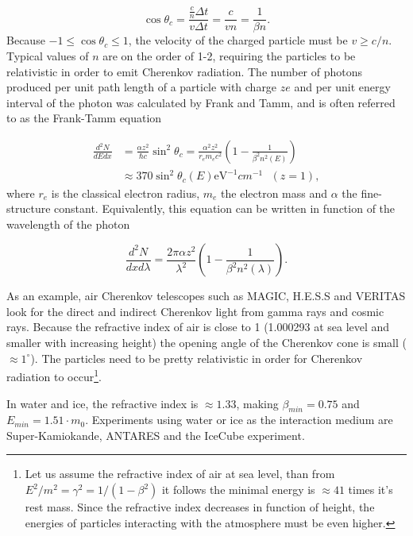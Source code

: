 \begin{equation}
\cos\theta_c = \frac{\frac{c}{n} \Delta t}{v \Delta t} = \frac{c}{vn} = \frac{1}{\beta n}.
\end{equation} 
Because $-1 \leq \cos\theta_c \leq 1$, the velocity of the charged particle must be $v \geq c/n$. Typical values of $n$ are on the order of 1-2, requiring the particles to be relativistic in order to emit Cherenkov radiation. The number of photons produced per unit path length of a particle with charge $ze$ and per unit energy interval of the photon was calculated by Frank and Tamm, and is often referred to as the Frank-Tamm equation \cite{pdg2018url}

\begin{equation}
\begin{split}
\frac{d^2N}{dE dx} &= \frac{\alpha z^2}{\hbar c} \sin^2 \theta_c = \frac{\alpha^2 z^2}{r_e m_e c^2} \left( 1 - \frac{1}{\beta^2 n^2\left(E\right)} \right)\\
&\approx 370 \sin^2 \theta_c \left(E\right) \textrm{eV}^{-1} cm^{-1} \ \ \ \left( z =1\right),
\end{split}
\end{equation}
where $r_e$ is the classical electron radius, $m_e$ the electron mass and $\alpha$ the fine-structure constant. Equivalently, this equation can be written in function of the wavelength of the photon

\begin{equation}
\label{eq:franktamm}
\frac{d^2N}{dx d\lambda}  = \frac{2\pi \alpha z^2}{\lambda^2} \left(1- \frac{1}{\beta^2 n^2 \left(\lambda \right)} \right).
\end{equation}

As an example, air Cherenkov telescopes such as MAGIC, H.E.S.S and VERITAS look for the direct and indirect Cherenkov light from gamma rays and cosmic rays. Because the refractive index of air is close to 1 (1.000293 at sea level and smaller with increasing height) the opening angle of the Cherenkov cone is small ($\approx 1^{\circ}$). The particles need to be pretty relativistic in order for Cherenkov radiation to occur\footnote{Let us assume the refractive index of air at sea level, than from $E^2/m^2 = \gamma^2 = 1/(1-\beta^2)$ it follows the minimal energy is $\approx 41$ times it's rest mass. Since the refractive index decreases in function of height, the energies of particles interacting with the atmosphere must be even higher.}.

In water and ice, the refractive index is $\approx 1.33$, making $\beta_{min} = 0.75$ and $E_{min} = 1.51 \cdot m_0$. Experiments using water or ice as the interaction medium are Super-Kamiokande, ANTARES and the IceCube experiment.
